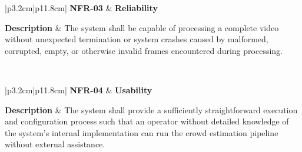 
\begin{table}[H]
	\centering
	\renewcommand{\arraystretch}{1.25}
	\begin{tabular}{|p{3.2cm}|p{11.8cm}|}
		\hline
		\textbf{NFR-03} &
		\textbf{Reliability} \\ \hline
		
		\textbf{Description} &
		The system shall be capable of processing a complete video without unexpected termination or system crashes caused by malformed, corrupted, empty, or otherwise invalid frames encountered during processing. \\ \hline
		
		 \\ \hline
	\end{tabular}
	\caption{Non-functional requirement for system reliability.}
	\label{tab:nfr03}
\end{table}


\begin{table}[H]
	\centering
	\renewcommand{\arraystretch}{1.25}
	\begin{tabular}{|p{3.2cm}|p{11.8cm}|}
		\hline
		\textbf{NFR-04} &
		\textbf{Usability} \\ \hline
		
		\textbf{Description} &
		The system shall provide a sufficiently straightforward execution and configuration process such that an operator without detailed knowledge of the system's internal implementation can run the crowd estimation pipeline without external assistance. \\ \hline
		
		 \\ \hline
	\end{tabular}
	\caption{Non-functional requirement for system usability.}
	\label{tab:nfr04}
\end{table}

